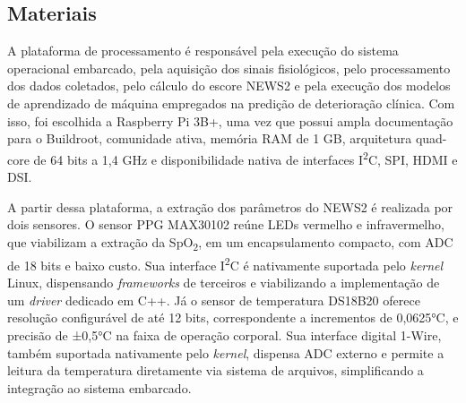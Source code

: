 \subsection{Materiais}

A plataforma de processamento é responsável pela execução do sistema 
operacional embarcado, pela aquisição dos sinais fisiológicos, pelo 
processamento dos dados coletados, pelo cálculo do escore NEWS2 e pela 
execução dos modelos de aprendizado de máquina empregados na predição de 
deterioração clínica. Com isso, foi escolhida a Raspberry Pi 3B+, uma vez que possui ampla documentação para o Buildroot, comunidade ativa, memória RAM de 1 GB, arquitetura 
quad-core de 64 bits a 1,4 GHz e disponibilidade nativa de interfaces
I\textsuperscript{2}C, SPI, HDMI e DSI.

A partir dessa plataforma, a extração dos parâmetros do NEWS2 é realizada por dois sensores. O sensor PPG MAX30102 reúne LEDs vermelho e infravermelho, que viabilizam a extração da SpO\textsubscript{2}, em um encapsulamento compacto, com ADC de 18 bits e baixo custo. Sua interface I\textsuperscript{2}C é nativamente suportada pelo \textit{kernel} Linux, dispensando \textit{frameworks} de terceiros e viabilizando a implementação de um \textit{driver} dedicado em C++. Já o sensor de temperatura DS18B20 oferece resolução configurável de até 12 bits, correspondente a incrementos de 0,0625°C, e precisão de ±0,5°C na faixa de operação corporal. Sua interface digital 1-Wire, também suportada nativamente pelo \textit{kernel}, dispensa ADC externo e permite a leitura da temperatura diretamente via sistema de arquivos, simplificando a integração ao sistema embarcado.



